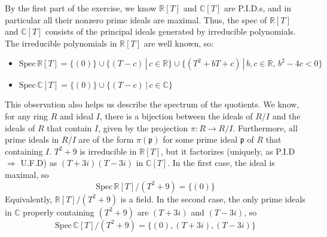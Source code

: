 \begin{problem}
\begin{enumerate}[label=(\theproblem.\arabic*),ref=\theproblem.\arabic*]
\begin{sol}
                    By the first part of the exercise, we know $\mathbb{R}[T]$ and $\mathbb{C}[T]$ are P.I.D.s,
                    and in particular all their nonzero prime ideals are maximal.
                    Thus, the spec of $\mathbb{R}[T]$ and $\mathbb{C}[T]$ consists
                    of the principal ideals generated by irreducible polynomials.
                    The irreducible polynomials in $\mathbb{R}[T]$ are well known, so:
                    \begin{itemize}
                        \item $\text{Spec}\,\mathbb{R}[T] = \{ (0)\} \cup \{ (T-c) \, | \, c \in \mathbb{R} \}
                        \cup \{(T^2 + bT + c) \, | \, b, c \in \mathbb{R}, \, b^2-4c < 0\}$
                        \item $\text{Spec}\,\mathbb{C}[T] = \{ (0)\} \cup \{ (T-c) \, | \, c \in \mathbb{C} \}$
                    \end{itemize}
                    This observation also helps us describe the spectrum of the quotients.
                    We know, for any ring $R$ and ideal $I$,
                    there is a bijection between the ideals of $R/I$ and the ideals of $R$ that contain $I$,
                    given by the projection $\pi: R \rightarrow R/I$.
                    Furthermore, all prime ideals in $R/I$ are of the form $\pi(\mathfrak{p})$ for some prime ideal $\mathfrak{p}$
                    of $R$ that containing $I$. $T^2 + 9$ is irreducible in $\mathbb{R}[T]$,
                    but it factorizes (uniquely, as P.I.D $\Rightarrow$ U.F.D) as $(T+3i)(T-3i)$ in $\mathbb{C}[T]$.
                    In the first case, the ideal is maximal, so
                    \[
                        \text{Spec}\,\mathbb{R}[T]/(T^2+9) = \{ (0)\}
                    \]
                    Equivalently, $\mathbb{R}[T]/(T^2+9)$ is a field.
                    In the second case, the only prime ideals in $\mathbb{C}$ properly containing
                    $(T^2+9)$ are $(T + 3i)$ and $(T - 3i)$, so
                    \[
                        \text{Spec}\,\mathbb{C}[T]/(T^2+9) = \{ (0), (T + 3i), (T - 3i) \}
                    \]

            \end{sol}
    \end{enumerate}
\end{problem}